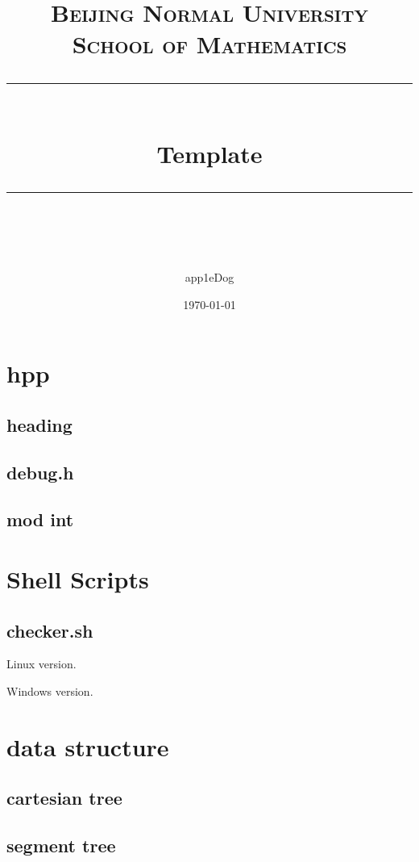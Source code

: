 \documentclass[UTF8, a4paper, titlepage, twoside]{ctexart}
\title{	
	\normalfont\normalsize
	\textsc{Beijing Normal University \\ School of Mathematics}\\ 
	\vspace{25pt} 
	\rule{\linewidth}{0.5pt}\\ 
	\vspace{20pt} 
	{\Huge Template}\\ 
	\vspace{12pt} 
	\rule{\linewidth}{2pt}\\ 
	\vspace{12pt} 
}
\author{\LARGE app1eDog}
\date{\normalsize\today}
\begin{document}
\maketitle

\tableofcontents

\newpage
\section{ hpp }
  \subsection{ heading }
    

  \subsection{ debug.h }
    

  \subsection { mod int }
    

\newpage
\section{ Shell Scripts }

  \subsection{ checker.sh }

  Linux version.
  

  Windows version.
  

\section{data structure}
  \subsection{cartesian tree}

  \subsection{segment tree}
    
    
    
    
\end{document}
